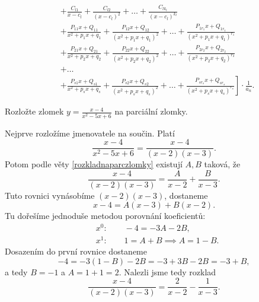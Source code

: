 \begin{veta}
\begin{align*}
          & + \frac{C_{l1}}{x-c_l} + \frac{C_{l2}}{(x-c_l)^2} +
              \dots + \frac{C_{lk_l}}{(x-c_l)^{k_l}} \\
          & + \frac{P_{11}x + Q_{11}}{x^2 + p_1x + q_1}
              + \frac{P_{12}x + Q_{12}}{(x^2 + p_1x + q_1)^2} + \dots
              + \frac{P_{1r_1}x + Q_{1r_1}}{(x^2 + p_1x + q_1)^{r_1}} \\
          & + \frac{P_{21}x + Q_{21}}{x^2 + p_2x + q_2}
              + \frac{P_{22}x + Q_{22}}{(x^2 + p_2x + q_2)^2} + \dots
              + \frac{P_{2r_2}x + Q_{2r_2}}{(x^2 + p_2x + q_2)^{r_2}} \\
          & + \dots \\
          & + \left . \frac{P_{s1}x + Q_{s1}}{x^2 + p_sx + q_s}
              + \frac{P_{s2}x + Q_{s2}}{(x^2 + p_sx + q_s)^2} + \dots
              + \frac{P_{sr_s}x + Q_{sr_s}}{(x^2 + p_sx + q_s)^{r_s}} \right ]
              \cdot \frac{1}{a_n}.
    \end{align*}
\end{veta}

\begin{priklad}
Rozložte zlomek $y=\frac{x-4}{x^2-5x+6}$ na parciální zlomky.
\end{priklad}

\begin{reseni}
Nejprve rozložíme jmenovatele na součin. Platí
$$
    \frac{x-4}{x^2-5x+6} = \frac{x-4}{(x-2)(x-3)}.
$$
Potom podle věty \ref{rozkladnaparczlomky} existují $A,B$ taková, že
$$
\frac{x-4}{(x-2)(x-3)} = \frac{A }{x-2} + \frac{B }{x-3}.
$$
Tuto rovnici vynásobíme $(x-2)(x-3)$, dostaneme
$$
    x-4 = A(x-3) + B(x-2).
$$
Tu dořešíme jednoduše metodou porovnání koeficientů:
\begin{align*}
	&x^0: \qquad  -4 = -3A-2B, \\
	&x^1: \qquad  1 = A+B \implies A = 1-B.
\end{align*}
Dosazením do první rovnice dostaneme
$$
    -4 = -3(1-B)-2B = -3 + 3B - 2B = -3 + B,
$$
a tedy $B=-1$ a $A=1+1=2$. Nalezli jsme tedy rozklad
$$
\frac{x-4}{(x-2)(x-3)} = \frac{2 }{x-2} - \frac{1 }{x-3}.
$$
\end{reseni}
